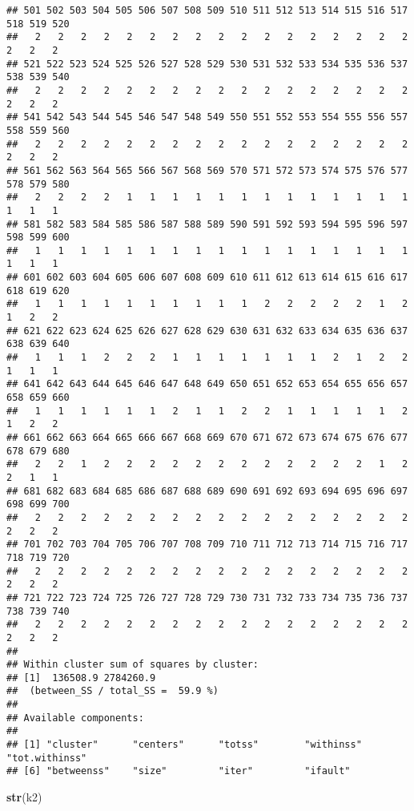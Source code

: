 \documentclass[
]{article}
\newenvironment{Shaded}{\begin{snugshade}}{\end{snugshade}}
\newcommand{\KeywordTok}[1]{\textcolor[rgb]{0.13,0.29,0.53}{\textbf{#1}}}
\newcommand{\NormalTok}[1]{#1}
\begin{document}
\begin{verbatim}
## 501 502 503 504 505 506 507 508 509 510 511 512 513 514 515 516 517 518 519 520 
##   2   2   2   2   2   2   2   2   2   2   2   2   2   2   2   2   2   2   2   2 
## 521 522 523 524 525 526 527 528 529 530 531 532 533 534 535 536 537 538 539 540 
##   2   2   2   2   2   2   2   2   2   2   2   2   2   2   2   2   2   2   2   2 
## 541 542 543 544 545 546 547 548 549 550 551 552 553 554 555 556 557 558 559 560 
##   2   2   2   2   2   2   2   2   2   2   2   2   2   2   2   2   2   2   2   2 
## 561 562 563 564 565 566 567 568 569 570 571 572 573 574 575 576 577 578 579 580 
##   2   2   2   2   1   1   1   1   1   1   1   1   1   1   1   1   1   1   1   1 
## 581 582 583 584 585 586 587 588 589 590 591 592 593 594 595 596 597 598 599 600 
##   1   1   1   1   1   1   1   1   1   1   1   1   1   1   1   1   1   1   1   1 
## 601 602 603 604 605 606 607 608 609 610 611 612 613 614 615 616 617 618 619 620 
##   1   1   1   1   1   1   1   1   1   1   2   2   2   2   2   1   2   1   2   2 
## 621 622 623 624 625 626 627 628 629 630 631 632 633 634 635 636 637 638 639 640 
##   1   1   1   2   2   2   1   1   1   1   1   1   1   2   1   2   2   1   1   1 
## 641 642 643 644 645 646 647 648 649 650 651 652 653 654 655 656 657 658 659 660 
##   1   1   1   1   1   1   2   1   1   2   2   1   1   1   1   1   2   1   2   2 
## 661 662 663 664 665 666 667 668 669 670 671 672 673 674 675 676 677 678 679 680 
##   2   2   1   2   2   2   2   2   2   2   2   2   2   2   2   1   2   2   1   1 
## 681 682 683 684 685 686 687 688 689 690 691 692 693 694 695 696 697 698 699 700 
##   2   2   2   2   2   2   2   2   2   2   2   2   2   2   2   2   2   2   2   2 
## 701 702 703 704 705 706 707 708 709 710 711 712 713 714 715 716 717 718 719 720 
##   2   2   2   2   2   2   2   2   2   2   2   2   2   2   2   2   2   2   2   2 
## 721 722 723 724 725 726 727 728 729 730 731 732 733 734 735 736 737 738 739 740 
##   2   2   2   2   2   2   2   2   2   2   2   2   2   2   2   2   2   2   2   2 
## 
## Within cluster sum of squares by cluster:
## [1]  136508.9 2784260.9
##  (between_SS / total_SS =  59.9 %)
## 
## Available components:
## 
## [1] "cluster"      "centers"      "totss"        "withinss"     "tot.withinss"
## [6] "betweenss"    "size"         "iter"         "ifault"
\end{verbatim}

\begin{Shaded}
\begin{Highlighting}[]
\KeywordTok{str}\NormalTok{(k2)}
\end{Highlighting}
\end{Shaded}
\end{document}
